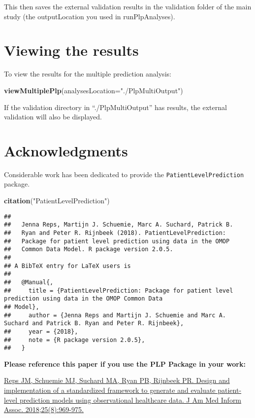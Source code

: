 \documentclass[]{article}
\newenvironment{Shaded}{\begin{snugshade}}{\end{snugshade}}
\newcommand{\KeywordTok}[1]{\textcolor[rgb]{0.13,0.29,0.53}{\textbf{#1}}}
\newcommand{\DataTypeTok}[1]{\textcolor[rgb]{0.13,0.29,0.53}{#1}}
\newcommand{\StringTok}[1]{\textcolor[rgb]{0.31,0.60,0.02}{#1}}
\newcommand{\NormalTok}[1]{#1}
\begin{document}
This then saves the external validation results in the validation folder
of the main study (the outputLocation you used in runPlpAnalyses).

\section{Viewing the results}\label{viewing-the-results}

To view the results for the multiple prediction analysis:

\begin{Shaded}
\begin{Highlighting}[]
\KeywordTok{viewMultiplePlp}\NormalTok{(}\DataTypeTok{analysesLocation=}\StringTok{"./PlpMultiOutput"}\NormalTok{)}
\end{Highlighting}
\end{Shaded}

If the validation directory in ``./PlpMultiOutput'' has results, the
external validation will also be displayed.

\section{Acknowledgments}\label{acknowledgments}

Considerable work has been dedicated to provide the
\texttt{PatientLevelPrediction} package.

\begin{Shaded}
\begin{Highlighting}[]
\KeywordTok{citation}\NormalTok{(}\StringTok{"PatientLevelPrediction"}\NormalTok{)}
\end{Highlighting}
\end{Shaded}

\begin{verbatim}
## 
##   Jenna Reps, Martijn J. Schuemie, Marc A. Suchard, Patrick B.
##   Ryan and Peter R. Rijnbeek (2018). PatientLevelPrediction:
##   Package for patient level prediction using data in the OMOP
##   Common Data Model. R package version 2.0.5.
## 
## A BibTeX entry for LaTeX users is
## 
##   @Manual{,
##     title = {PatientLevelPrediction: Package for patient level prediction using data in the OMOP Common Data
## Model},
##     author = {Jenna Reps and Martijn J. Schuemie and Marc A. Suchard and Patrick B. Ryan and Peter R. Rijnbeek},
##     year = {2018},
##     note = {R package version 2.0.5},
##   }
\end{verbatim}

\textbf{Please reference this paper if you use the PLP Package in your
work:}

\href{http://dx.doi.org/10.1093/jamia/ocy032}{Reps JM, Schuemie MJ,
Suchard MA, Ryan PB, Rijnbeek PR. Design and implementation of a
standardized framework to generate and evaluate patient-level prediction
models using observational healthcare data. J Am Med Inform Assoc.
2018;25(8):969-975.}
\end{document}
